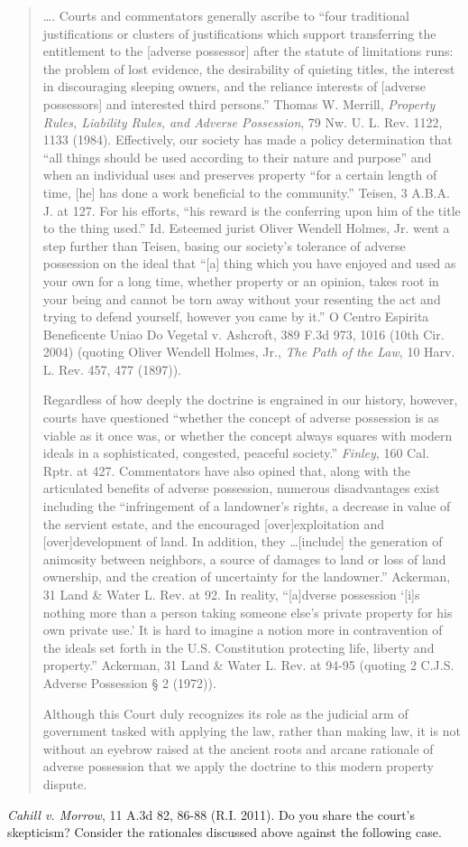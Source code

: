 \begin{quotation}
\ldots. Courts and commentators generally ascribe to ``four traditional
justifications or clusters of justifications which support transferring the
entitlement to the [adverse possessor] after the statute of limitations runs:
the problem of lost evidence, the desirability of quieting titles, the interest
in discouraging sleeping owners, and the reliance interests of [adverse
possessors] and interested third persons.'' Thomas W. Merrill, \textit{Property
Rules, Liability Rules, and Adverse Possession}, 79 Nw. U. L. Rev. 1122, 1133
(1984). Effectively, our society has made a policy determination that ``all
things should be used according to their nature and purpose'' and when an
individual uses and preserves property ``for a certain length of time, [he] has
done a work beneficial to the community.'' Teisen, 3 A.B.A. J. at 127. For his
efforts, ``his reward is the conferring upon him of the title to the thing
used.'' Id. Esteemed jurist Oliver Wendell Holmes, Jr. went a step further than
Teisen, basing our society's tolerance of adverse possession on the ideal that
``[a] thing which you have enjoyed and used as your own for a long time,
whether property or an opinion, takes root in your being and cannot be torn
away without your resenting the act and trying to defend yourself, however you
came by it.'' O Centro Espirita Beneficente Uniao Do Vegetal v. Ashcroft, 389
F.3d 973, 1016 (10th Cir. 2004) (quoting Oliver Wendell Holmes, Jr.,
\textit{The Path of the Law}, 10 Harv. L. Rev. 457, 477 (1897)).

Regardless of how deeply the doctrine is engrained in our history, however,
courts have questioned ``whether the concept of adverse possession is as viable
as it once was, or whether the concept always squares with modern ideals in a
sophisticated, congested, peaceful society.'' \textit{Finley}, 160 Cal. Rptr.
at 427. Commentators have also opined that, along with the articulated benefits
of adverse possession, numerous disadvantages exist including the
``infringement of a landowner's rights, a decrease in value of the servient
estate, and the encouraged [over]exploitation and [over]development of land. In
addition, they \ldots [include] the generation of animosity between neighbors,
a source of damages to land or loss of land ownership, and the creation of
uncertainty for the landowner.'' Ackerman, 31 Land
\& Water L. Rev. at 92. In reality, ``[a]dverse possession `[i]s nothing more
than a person taking someone else's private property for his own private use.'
It is hard to imagine a notion more in contravention of the ideals set forth in
the U.S. Constitution protecting life, liberty and property.'' Ackerman, 31
Land \& Water L. Rev. at 94-95 (quoting 2 C.J.S. Adverse Possession {\S} 2
(1972)).

Although this Court duly recognizes its role as the judicial arm of government
tasked with applying the law, rather than making law, it is not without an
eyebrow raised at the ancient roots and arcane rationale of adverse possession
that we apply the doctrine to this modern property dispute.
\end{quotation}
\textit{Cahill v. Morrow}, 11 A.3d 82, 86-88 (R.I. 2011). Do you share the
court's skepticism? Consider the rationales discussed above against the
following case. 


